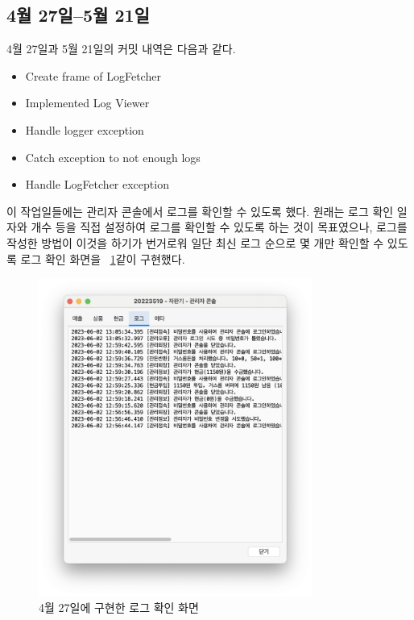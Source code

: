 \documentclass{oblivoir}
\newcommand{\figref}[1]{\figurename~\ref{#1}}
\begin{document}
    \subsection{4월 27일--5월 21일}

    4월 27일과 5월 21일의 커밋 내역은 다음과 같다.
    \begin{itemize}
        \item Create frame of LogFetcher
        \item Implemented Log Viewer
        \item Handle logger exception
        \item Catch exception to not enough logs
        \item Handle LogFetcher exception
    \end{itemize}

    이 작업일들에는 관리자 콘솔에서 로그를 확인할 수 있도록 했다.
    원래는 로그 확인 일자와 개수 등을 직접 설정하여 로그를 확인할 수 있도록 하는 것이 목표였으나,
    로그를 작성한 방법이 이것을 하기가 번거로워 일단 최신 로그 순으로 몇 개만 확인할 수 있도록 로그 확인 화면을
    \figref{fig:0427-log-console}\와 같이 구현했다.
    \begin{figure}[h]
        \centering
        \includegraphics[width=0.8\textwidth]{0427-log-console.png}
        \caption{4월 27일에 구현한 로그 확인 화면}
        \label{fig:0427-log-console}
    \end{figure}
\end{document}
